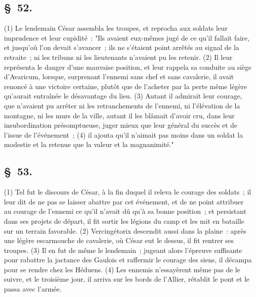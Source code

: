 \documentclass[french,twoside]{book} %
\begin{document}
\subsection[{§ 52.}]{ \textsc{§ 52.} }
\noindent (1) Le lendemain César assembla les troupes, et reprocha aux soldats leur imprudence et leur cupidité : "Ils avaient eux-mêmes jugé de ce qu’il fallait faire, et jusqu’où l’on devait s’avancer ; ils ne s’étaient point arrêtés au signal de la retraite ; ni les tribuns ni les lieutenants n’avaient pu les retenir. (2) Il leur représenta le danger d’une mauvaise position, et leur rappela sa conduite au siège d’Avaricum, lorsque, surprenant l’ennemi sans chef et sans cavalerie, il avait renoncé à une victoire certaine, plutôt que de l’acheter par la perte même légère qu’aurait entraînée le désavantage du lieu. (3) Autant il admirait leur courage, que n’avaient pu arrêter ni les retranchements de l’ennemi, ni l’élévation de la montagne, ni les murs de la ville, autant il les blâmait d’avoir cru, dans leur insubordination présomptueuse, juger mieux que leur général du succès et de l’issue de l’événement ; (4) il ajouta qu’il n’aimait pas moins dans un soldat la modestie et la retenue que la valeur et la magnanimité."
\subsection[{§ 53.}]{ \textsc{§ 53.} }
\noindent (1) Tel fut le discours de César, à la fin duquel il releva le courage des soldats ; il leur dit de ne pas se laisser abattre par cet événement, et de ne point attribuer au courage de l’ennemi ce qu’il n’avait dû qu’à sa bonne position ; et persistant dans ses projets de départ, il fit sortir les légions du camp et les mit en bataille sur un terrain favorable. (2) Vercingétorix descendit aussi dans la plaine : après une légère escarmouche de cavalerie, où César eut le dessus, il fit rentrer ses troupes. (3) Il en fut de même le lendemain ; jugeant alors l’épreuve suffisante pour rabattre la jactance des Gaulois et raffermir le courage des siens, il décampa pour se rendre chez les Héduens. (4) Les ennemis n’essayèrent même pas de le suivre, et le troisième jour, il arriva sur les bords de l’Allier, rétablit le pont et le passa avec l’armée.
\end{document}
